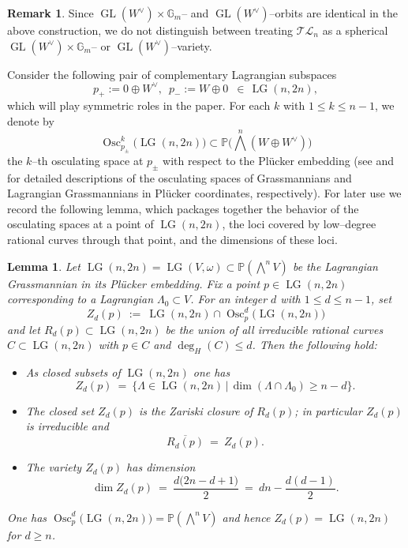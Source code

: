 \documentclass[10pt]{amsart}
\newtheorem{lemma}[theorem]{Lemma}
\theoremstyle{definition}
\newtheorem{remark}[theorem]{Remark}
\newcommand{\Pbb}{\mathbb{P}}
\newcommand{\Pic}{\operatorname{Pic}}
\newcommand{\LG}{\operatorname{LG}}
\DeclareMathOperator{\Osc}{Osc}
\newcommand{\TL}{\mathcal{TL}}
\theoremstyle{plain} %
\begin{document}
\begin{remark}
Since $\operatorname{GL}(W^\vee) \times \mathbb{G}_m$-- and $\operatorname{GL}(W^\vee)$--orbits are identical in the above construction, we do not distinguish between treating $\TL_n$ as a spherical $\operatorname{GL}(W^\vee) \times \mathbb{G}_m$-- or $\operatorname{GL}(W^\vee)$--variety.
\end{remark}
Consider the following pair of complementary Lagrangian subspaces 
\begin{equation}\label{p+-}
p_+ := 0\oplus W^\vee,\,\,\, p_- :=W\oplus 0 \,\,\,\in\,\LG(n,2n),
\end{equation}
which will play symmetric roles in the paper. For each $k$ with $1\leq k\leq n-1$, we denote by
\[
\Osc^k_{p_\pm}\big(\LG(n,2n)\big) \subset \Pbb\big(\bigwedge^n(W\oplus W^\vee)\big)
\]
the $k$--th osculating space at $p_\pm$ with respect to the Pl\"ucker embedding (see \cite[Section~6]{MR18} and \cite[Section~3.4]{FMR20} for detailed
descriptions of the osculating spaces of Grassmannians and Lagrangian
Grassmannians in Pl\"ucker coordinates, respectively). For later use we record the following
lemma, which packages together the behavior of the osculating spaces at a
point of $\LG(n,2n)$, the loci covered by low--degree rational curves through
that point, and the dimensions of these loci.

\begin{lemma}\label{lem:osculating-curves-LG}
Let %
\(
\LG(n,2n)=\LG(V,\omega)\subset\Pbb(\bigwedge^n V)
\)
be the Lagrangian Grassmannian in its Pl\"ucker embedding.
Fix a point $p\in\LG(n,2n)$ corresponding to a Lagrangian 
$\Lambda_0\subset V$. %
For an integer $d$ with $1\leq d\leq n-1$, set
\[
Z_d(p)\ :=\ \LG(n,2n)\cap\Osc^d_p\big(\LG(n,2n)\big)
\]
and let $R_d(p)\subset \LG(n,2n)$ be the union of all irreducible rational
curves $C\subset\LG(n,2n)$ with $p\in C$ and $\deg_H(C)\leq d$.
Then the following hold:
\begin{itemize}
  \item[\text{(i)}] As closed subsets of $\LG(n,2n)$ one has
  \[
  Z_d(p)
  \ =\
  \big\{\Lambda\in\LG(n,2n)\,\big|\,
      \dim(\Lambda\cap\Lambda_0)\geq n-d\big\}.
  \]
  \item[\text{(ii)}] The closed set $Z_d(p)$ is the Zariski closure of $R_d(p)$; in
  particular $Z_d(p)$ is irreducible and
  \[
  \overline{R_d(p)}\ =\ Z_d(p).
  \]
  \item[\text{(iii)}] The variety $Z_d(p)$ has dimension
  \[
  \dim Z_d(p)
  \ =\
  \frac{d\big(2n-d+1\big)}{2}
  \ =\
  dn-\frac{d(d-1)}{2}.
  \]
\end{itemize}
One has $\Osc^d_p\big(\LG(n,2n)\big)=\Pbb(\bigwedge^n V)$ and hence
$Z_d(p)=\LG(n,2n)$ for $d\geq n$.
\end{lemma}
\end{document}
